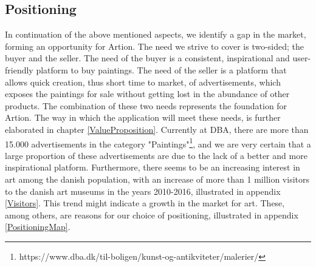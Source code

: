 \subsection{Positioning}
In continuation of the above mentioned aspects, we identify a gap in the market, forming an opportunity for Artion. The need we strive to cover is two-sided; the buyer and the seller. The need of the buyer is a consistent, inspirational and user-friendly platform to buy paintings. The need of the seller is a platform that allows quick creation, thus short time to market, of advertisements, which exposes the paintings for sale without getting lost in the abundance of other products. The combination of these two needs represents the foundation for Artion. The way in which the application will meet these needs, is further elaborated in chapter \ref{ValueProposition}. Currently at DBA, there are more than 15.000 advertisements in the category "Paintings"\footnote{https://www.dba.dk/til-boligen/kunst-og-antikviteter/malerier/}, and we are very certain that a large proportion of these advertisements are due to the lack of a better and more inspirational platform. Furthermore, there seems to be an increasing interest in art among the danish population, with an increase of more than 1 million visitors to the danish art museums in the years 2010-2016, illustrated in appendix \ref{Visitors}. This trend might indicate a growth in the market for art. These, among others, are reasons for our choice of positioning, illustrated in appendix \ref{PositioningMap}.